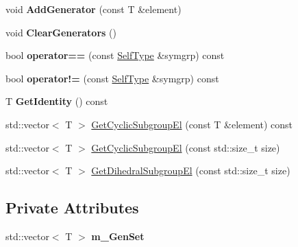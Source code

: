 \begin{DoxyCompactItemize}
\item 
\hypertarget{classcSymmetricRep_a59125541fe5801e2073cacb54ed879d8}{void {\bfseries \-Add\-Generator} (const \-T \&element)}\label{classcSymmetricRep_a59125541fe5801e2073cacb54ed879d8}

\item 
\hypertarget{classcSymmetricRep_a37c8cab52b7ef4aa4b83f3ef203036ef}{void {\bfseries \-Clear\-Generators} ()}\label{classcSymmetricRep_a37c8cab52b7ef4aa4b83f3ef203036ef}

\item 
\hypertarget{classcSymmetricRep_a30639c704b01408475c9fd4a100d738d}{bool {\bfseries operator==} (const \hyperlink{classcSymmetricRep}{\-Self\-Type} \&symgrp) const }\label{classcSymmetricRep_a30639c704b01408475c9fd4a100d738d}

\item 
\hypertarget{classcSymmetricRep_a77bcf4f11ff92c57aa6626c075bf3355}{bool {\bfseries operator!=} (const \hyperlink{classcSymmetricRep}{\-Self\-Type} \&symgrp) const }\label{classcSymmetricRep_a77bcf4f11ff92c57aa6626c075bf3355}

\item 
\hypertarget{classcSymmetricRep_a5182c5dcf4247c03a7e0de001e7c1cf3}{\-T {\bfseries \-Get\-Identity} () const }\label{classcSymmetricRep_a5182c5dcf4247c03a7e0de001e7c1cf3}

\item 
std\-::vector$<$ \-T $>$ \hyperlink{classcSymmetricRep_a2dfa5d3358d69914a625536d994be72c}{\-Get\-Cyclic\-Subgroup\-El} (const \-T \&element) const 
\item 
std\-::vector$<$ \-T $>$ \hyperlink{classcSymmetricRep_ac110028d8d6e161448f15bc1548d5274}{\-Get\-Cyclic\-Subgroup\-El} (const std\-::size\-\_\-t size)
\item 
std\-::vector$<$ \-T $>$ \hyperlink{classcSymmetricRep_a4a9724dc8ba8c8ccc041fe1f86dc4701}{\-Get\-Dihedral\-Subgroup\-El} (const std\-::size\-\_\-t size)
\end{DoxyCompactItemize}
\subsection*{\-Private \-Attributes}
\begin{DoxyCompactItemize}
\item 
\hypertarget{classcSymmetricRep_ab9afa5a928d6fba3c560e0245ab5d0e4}{std\-::vector$<$ \-T $>$ {\bfseries m\-\_\-\-Gen\-Set}}\label{classcSymmetricRep_ab9afa5a928d6fba3c560e0245ab5d0e4}

\end{DoxyCompactItemize}

